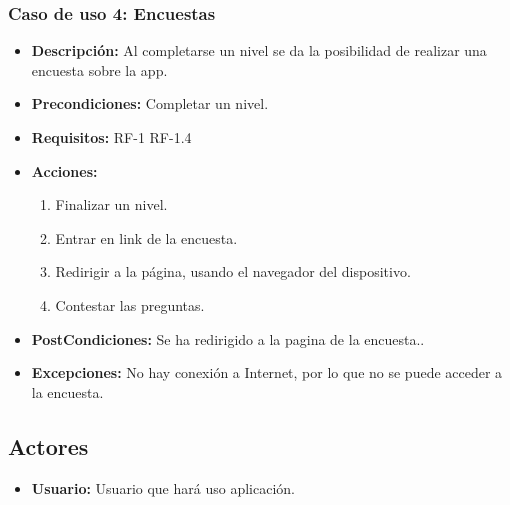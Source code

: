 \subsubsection{Caso de uso 4: Encuestas}
\begin{itemize}
	\item \textbf{Descripción:}  Al completarse un nivel se da la posibilidad de realizar una encuesta sobre la app.
	\item \textbf{Precondiciones:} Completar un nivel.
	\item \textbf{Requisitos:} RF-1 RF-1.4
	\item \textbf{Acciones:}
	\begin{enumerate}
		\item Finalizar un nivel.
		\item Entrar en link de la encuesta.
		\item Redirigir a la página, usando el navegador del dispositivo.
		\item Contestar las preguntas.
	\end{enumerate}
	\item \textbf{PostCondiciones:} Se ha redirigido a la pagina de la encuesta..
	\item \textbf{Excepciones:} No hay conexión a Internet, por lo que no se puede acceder a la encuesta.
	
\end{itemize}

\subsection{Actores}
\begin{itemize}
	\item \textbf{Usuario:} Usuario que hará uso aplicación.
\end{itemize}


